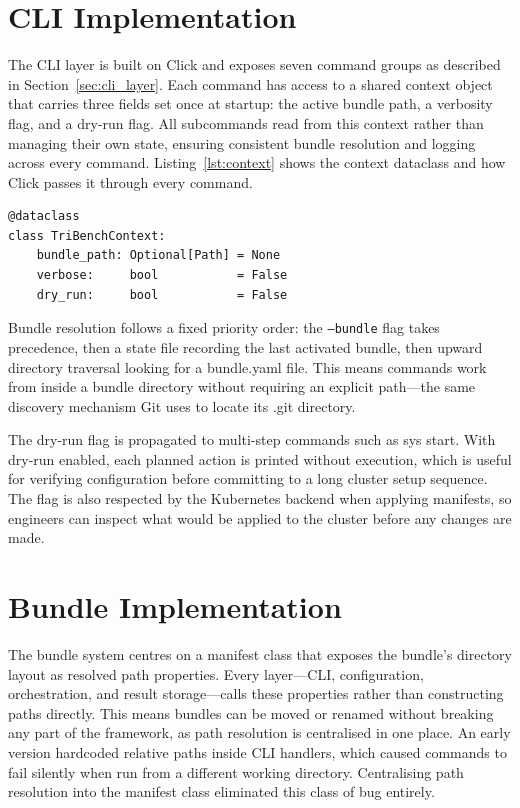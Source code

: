 \documentclass{l4proj}
\begin{document}
\section{CLI Implementation}
\label{sec:impl_cli}

The CLI layer is built on Click and exposes seven command groups as described in Section~\ref{sec:cli_layer}. Each command has access to a shared context object that carries three fields set once at startup: the active bundle path, a verbosity flag, and a dry-run flag. All subcommands read from this context rather than managing their own state, ensuring consistent bundle resolution and logging across every command. Listing~\ref{lst:context} shows the context dataclass and how Click passes it through every command.

\begin{lstlisting}[style=pythonstyle, caption={The shared TriBenchContext dataclass passed through every CLI command.}, label={lst:context}]
@dataclass
class TriBenchContext:
    bundle_path: Optional[Path] = None
    verbose:     bool           = False
    dry_run:     bool           = False
\end{lstlisting}

Bundle resolution follows a fixed priority order: the \texttt{--bundle} flag takes precedence, then a state file recording the last activated bundle, then upward directory traversal looking for a bundle.yaml file. This means commands work from inside a bundle directory without requiring an explicit path---the same discovery mechanism Git uses to locate its .git directory.

The dry-run flag is propagated to multi-step commands such as sys start. With dry-run enabled, each planned action is printed without execution, which is useful for verifying configuration before committing to a long cluster setup sequence. The flag is also respected by the Kubernetes backend when applying manifests, so engineers can inspect what would be applied to the cluster before any changes are made.

\section{Bundle Implementation}
\label{sec:impl_bundle}

The bundle system centres on a manifest class that exposes the bundle's directory layout as resolved path properties. Every layer---CLI, configuration, orchestration, and result storage---calls these properties rather than constructing paths directly. This means bundles can be moved or renamed without breaking any part of the framework, as path resolution is centralised in one place. An early version hardcoded relative paths inside CLI handlers, which caused commands to fail silently when run from a different working directory. Centralising path resolution into the manifest class eliminated this class of bug entirely.
\end{document}
